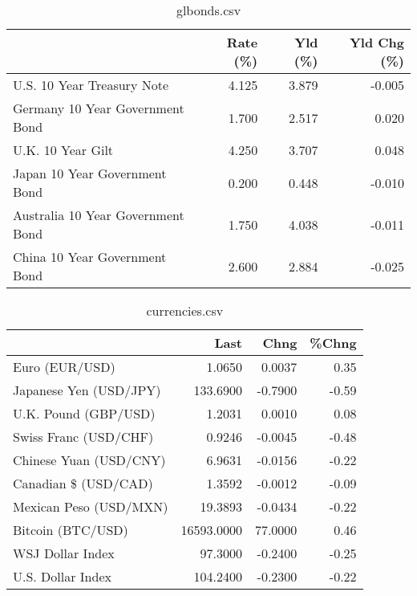 \documentclass{article}%
\begin{document}
%


\begin{table}[htbp]%
\caption{glbonds.csv}%
\centering%
\begin{adjustbox}{width=1\textwidth}%
\begin{tabular}{lrrr}
\toprule
                                  &  Rate (\%) &  Yld (\%) &  Yld Chg (\%) \\
\midrule
       U.S. 10 Year Treasury Note &     4.125 &    3.879 &       -0.005 \\
  Germany 10 Year Government Bond &     1.700 &    2.517 &        0.020 \\
                U.K. 10 Year Gilt &     4.250 &    3.707 &        0.048 \\
    Japan 10 Year Government Bond &     0.200 &    0.448 &       -0.010 \\
Australia 10 Year Government Bond &     1.750 &    4.038 &       -0.011 \\
    China 10 Year Government Bond &     2.600 &    2.884 &       -0.025 \\
\bottomrule
\end{tabular}
%
\end{adjustbox}%
\end{table}

%


\begin{table}[htbp]%
\caption{currencies.csv}%
\centering%
\begin{adjustbox}{width=1\textwidth}%
\begin{tabular}{lrrr}
\toprule
                       &       Last &    Chng &  \%Chng \\
\midrule
        Euro (EUR/USD) &     1.0650 &  0.0037 &   0.35 \\
Japanese Yen (USD/JPY) &   133.6900 & -0.7900 &  -0.59 \\
  U.K. Pound (GBP/USD) &     1.2031 &  0.0010 &   0.08 \\
 Swiss Franc (USD/CHF) &     0.9246 & -0.0045 &  -0.48 \\
Chinese Yuan (USD/CNY) &     6.9631 & -0.0156 &  -0.22 \\
  Canadian \$ (USD/CAD) &     1.3592 & -0.0012 &  -0.09 \\
Mexican Peso (USD/MXN) &    19.3893 & -0.0434 &  -0.22 \\
     Bitcoin (BTC/USD) & 16593.0000 & 77.0000 &   0.46 \\
      WSJ Dollar Index &    97.3000 & -0.2400 &  -0.25 \\
     U.S. Dollar Index &   104.2400 & -0.2300 &  -0.22 \\
\bottomrule
\end{tabular}
%
\end{adjustbox}%
\end{table}

%
\end{document}
